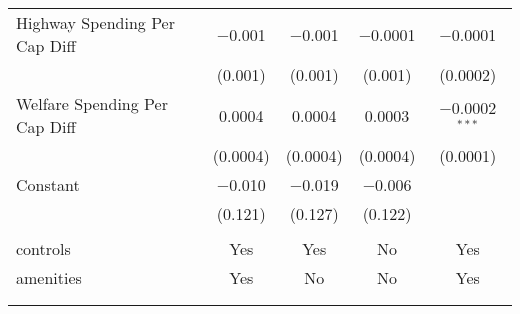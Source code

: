 \begin{table}[!htbp]
\begin{tabular}{@{\extracolsep{5pt}}lcccc}
  Highway Spending Per Cap Diff & $-$0.001 & $-$0.001 & $-$0.0001 & $-$0.0001 \\ 
  & (0.001) & (0.001) & (0.001) & (0.0002) \\ 
  Welfare Spending Per Cap Diff & 0.0004 & 0.0004 & 0.0003 & $-$0.0002$^{***}$ \\ 
  & (0.0004) & (0.0004) & (0.0004) & (0.0001) \\ 
  Constant & $-$0.010 & $-$0.019 & $-$0.006 &  \\ 
  & (0.121) & (0.127) & (0.122) &  \\ 
 \hline \\[-1.8ex] 
controls & Yes & Yes & No & Yes \\ 
amenities & Yes & No & No & Yes \\ 
\hline \\[-1.8ex] 
\hline 
\hline \\[-1.8ex] 
\end{tabular} 
\end{table} 
